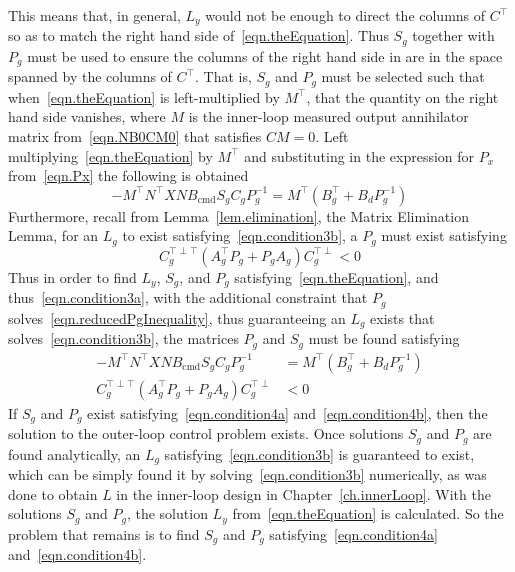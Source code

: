 This means that, in general, $L_{y}$ would not be enough to direct the columns of $C^{\top}$ so as to match the right hand side of\ \eqref{eqn.theEquation}.
Thus $S_{g}$ together with $P_{g}$ must be used to ensure the columns of the right hand side in are in the space spanned by the columns of $C^{\top}$.
That is, $S_{g}$ and $P_{g}$ must be selected such that when\ \eqref{eqn.theEquation} is left-multiplied by $M^{\top}$, that the quantity on the right hand side vanishes, where $M$ is the inner-loop measured output annihilator matrix from\ \eqref{eqn.NB0CM0} that satisfies $CM=0$.
Left multiplying\ \eqref{eqn.theEquation} by $M^{\top}$ and substituting in the expression for $P_{x}$ from\ \eqref{eqn.Px} the following is obtained
\begin{equation}
  \label{eqn.makeMeZero}
  -M^{\top}N^{\top}XNB_{\text{cmd}}S_{g}C_{g}P_{g}^{-1} = M^{\top}(B_{g}^{\top} + B_{d}P_{g}^{-1})
\end{equation}
Furthermore, recall from Lemma~\ref{lem.elimination}, the Matrix Elimination Lemma, for an $L_{g}$ to exist satisfying\ \eqref{eqn.condition3b}, a $P_{g}$ must exist satisfying
\begin{equation}
  \label{eqn.reducedPgInequality}
  C_{g}^{\top\perp\top} (A_{g}^{\top}P_{g} + P_{g}A_{g}) C_{g}^{\top\perp} < 0
\end{equation}
Thus in order to find $L_{y}$, $S_{g}$, and $P_{g}$ satisfying\ \eqref{eqn.theEquation}, and thus\ \eqref{eqn.condition3a}, with the additional constraint that $P_{g}$ solves\ \eqref{eqn.reducedPgInequality}, thus guaranteeing an $L_{g}$ exists that solves\ \eqref{eqn.condition3b}, the matrices $P_{g}$ and $S_{g}$ must be found satisfying
\begin{align}
  \label{eqn.condition4a}
  -M^{\top}N^{\top}XNB_{\text{cmd}}S_{g}C_{g}P_{g}^{-1} &= M^{\top}(B_{g}^{\top} + B_{d}P_{g}^{-1}) \\
  \label{eqn.condition4b}
  C_{g}^{\top\perp\top} (A_{g}^{\top}P_{g} + P_{g}A_{g}) C_{g}^{\top\perp} &< 0
\end{align}
If $S_{g}$ and $P_{g}$ exist satisfying\ \eqref{eqn.condition4a} and\ \eqref{eqn.condition4b}, then the solution to the outer-loop control problem exists.
Once solutions $S_{g}$ and $P_{g}$ are found analytically, an $L_{g}$ satisfying\ \eqref{eqn.condition3b} is guaranteed to exist, which can be simply found it by solving\ \eqref{eqn.condition3b} numerically, as was done to obtain $L$ in the inner-loop design in Chapter~\ref{ch.innerLoop}.
With the solutions $S_{g}$ and $P_{g}$, the solution $L_{y}$ from\ \eqref{eqn.theEquation} is calculated.
So the problem that remains is to find $S_{g}$ and $P_{g}$ satisfying\ \eqref{eqn.condition4a} and\ \eqref{eqn.condition4b}.

